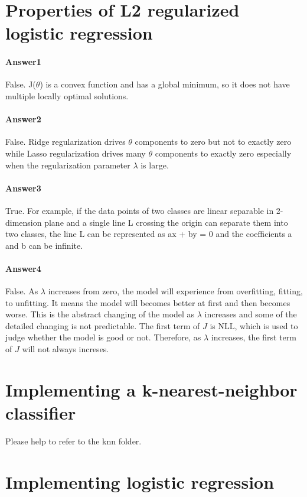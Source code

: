 \documentclass[paper=a4, fontsize=11pt]{scrartcl} %
\numberwithin{equation}{section} %
\numberwithin{figure}{section} %
\numberwithin{table}{section} %
\begin{document}
\section{Properties of L2 regularized logistic regression}
\paragraph{\textbf{Answer1}}False. J($\theta$) is a convex function and has a global minimum, so it does not have multiple locally optimal solutions.

\paragraph{\textbf{Answer2}}False. Ridge regularization drives $\theta$ components to zero but not to exactly zero while Lasso regularization drives many $\theta$ components to exactly zero especially when the regularization parameter $\lambda$ is large.

\paragraph{\textbf{Answer3}}True. For example, if the data points of two classes are linear separable in 2-dimension plane and a single line L crossing the origin can separate them into two classes, the line L can be represented as ax + by = 0 and the coefficients a and b can be infinite.

\paragraph{\textbf{Answer4}}False. As $\lambda$ increases from zero, the model will experience from overfitting, fitting, to unfitting. It means the model will becomes better at first and then becomes worse. This is the abstract changing of the model as $\lambda$ increases and some of the detailed changing is not predictable. The first term of $J$ is NLL, which is used to judge whether the model is good or not. Therefore, as $\lambda$ increases, the first term of $J$ will not always increses.

\section{Implementing a k-nearest-neighbor classifier} Please help to refer to the knn folder.



\section{Implementing logistic regression}
\end{document}
